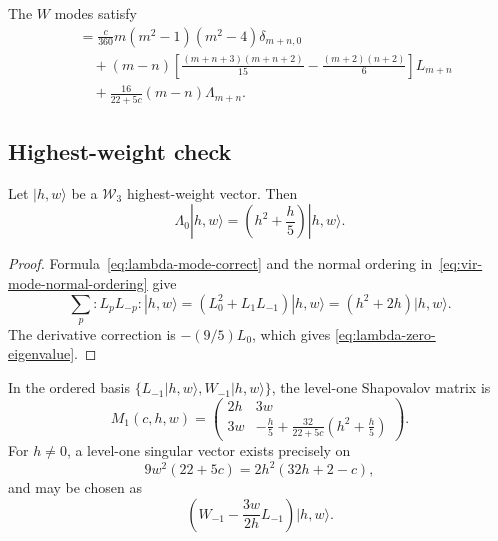 \begin{corollary}
\label{cor:w3-mode-commutator}
The $W$ modes satisfy
\begin{align}
[W_m,W_n]
&=\frac{c}{360}m(m^2-1)(m^2-4)\delta_{m+n,0}\nonumber\\
&\quad +(m-n)
\left[
\frac{(m+n+3)(m+n+2)}{15}
-\frac{(m+2)(n+2)}6
\right]L_{m+n}\nonumber\\
&\quad+\frac{16}{22+5c}(m-n)\Lambda_{m+n}.
\label{eq:w3-mode-commutator}
\end{align}
\end{corollary}

\subsection{Highest-weight check}

\begin{proposition}
\label{prop:lambda-zero-highest-weight}
Let $|h,w\rangle$ be a $\mathcal W_3$ highest-weight vector.  Then
\begin{equation}\label{eq:lambda-zero-eigenvalue}
\Lambda_0|h,w\rangle
=\left(h^2+\frac h5\right)|h,w\rangle.
\end{equation}
\end{proposition}

\begin{proof}
Formula~\eqref{eq:lambda-mode-correct} and the normal ordering
in~\eqref{eq:vir-mode-normal-ordering} give
\[
\sum_p{:}L_pL_{-p}{:}|h,w\rangle
=(L_0^2+L_1L_{-1})|h,w\rangle
=(h^2+2h)|h,w\rangle.
\]
The derivative correction is $-(9/5)L_0$, which gives
\eqref{eq:lambda-zero-eigenvalue}.
\end{proof}

\begin{theorem}
\label{thm:w3-kac-level1}
In the ordered basis
$\{L_{-1}|h,w\rangle,W_{-1}|h,w\rangle\}$, the level-one
Shapovalov matrix is
\begin{equation}\label{eq:w3-gram-level1}
M_1(c,h,w)=
\begin{pmatrix}
2h&3w\\[2pt]
3w&-\frac h5+\frac{32}{22+5c}\left(h^2+\frac h5\right)
\end{pmatrix}.
\end{equation}
For $h\ne0$, a level-one singular vector exists precisely on
\begin{equation}\label{eq:w3-null-curve}
9w^2(22+5c)=2h^2(32h+2-c),
\end{equation}
and may be chosen as
\begin{equation}\label{eq:w3-null-vector}
\left(W_{-1}-\frac{3w}{2h}L_{-1}\right)|h,w\rangle.
\end{equation}
\end{theorem}

